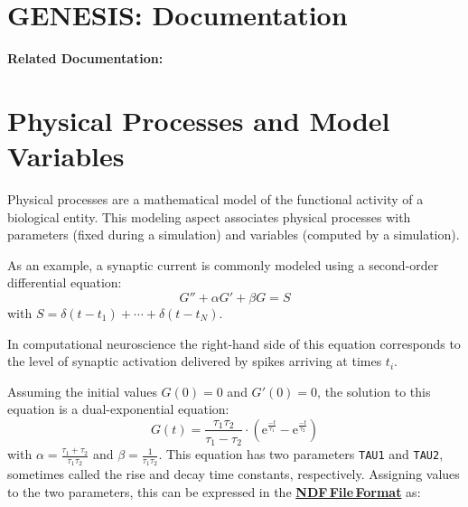 \documentclass[12pt]{article}
\begin{document}
\section*{GENESIS: Documentation}

{\bf Related Documentation:}

\section*{Physical Processes and Model Variables}

Physical processes are a mathematical model of the functional activity
of a biological entity.  This modeling aspect associates physical
processes with parameters (fixed during a simulation) and variables
(computed by a simulation).

As an example, a synaptic current is commonly modeled using a
second-order differential equation:
\begin{equation}
  \label{eq:second-order-synchan}
  G'' + \alpha G' + \beta G = S
\end{equation}
with $S = \delta(t - t_1) + \cdots + \delta(t - t_N)$.

In computational neuroscience the right-hand side of this equation
corresponds to the level of synaptic activation delivered by spikes
arriving at times $t_i$.

Assuming the initial values $G(0) = 0$ and $G'(0) = 0$, the solution
to this equation is a dual-exponential equation:
\begin{equation}
  \label{eq:dual-exponential}
  G(t) = \frac{\tau_1\tau_2}{\tau_1 - \tau_2}
  \cdot (\mathrm{e}^{\frac{-t}{\tau_1}} - \mathrm{e}^{\frac{-t}{\tau_2}})
\end{equation}
with $\alpha = \frac{\tau_1 + \tau_2}{\tau_1 \tau_2}$ and $\beta =
\frac{1}{\tau_1 \tau_2}$.
This equation has two parameters {\tt TAU1} and {\tt TAU2}, sometimes
called the rise and decay time constants, respectively.  Assigning
values to the two parameters, this can be expressed in the \href{../ndf-file-format/ndf-file-format.tex}{\bf NDF\,File\,Format}
as:
\end{document}

